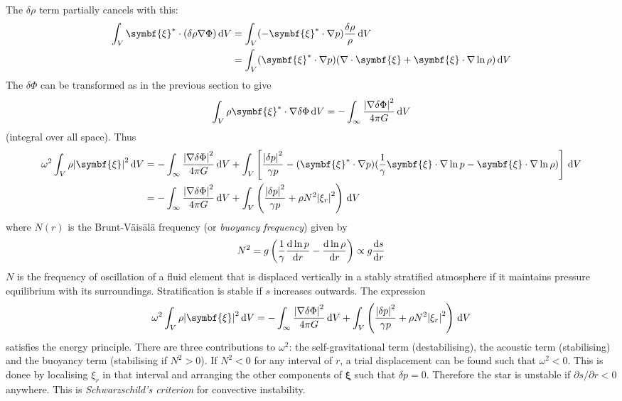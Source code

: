 \documentclass{jknotes}
\newcommand{\disp}{\symbf{\xi}}
\begin{document}
The $\delta \rho$ term partially cancels with this:
\begin{align}
	\int_V \disp^* \cdot (\delta \rho \nabla \Phi) \, \diffd V 
	&= \int_V (-\disp^* \cdot \nabla p) \frac{\delta \rho}{\rho} \, \diffd V \\
	&= \int_V (\disp^* \cdot \nabla p)(\nabla \cdot \disp + \disp \cdot \nabla
	\ln \rho) \, \diffd V
\end{align}
The $\delta \Phi$ can be transformed as in the previous section to give
\begin{equation}
	\int_V \rho \disp^* \cdot \nabla \delta \Phi \, \diffd V = -\int_\infty
	\frac{\abs{\nabla \delta \Phi}^2}{4\pi G} \, \diffd V
\end{equation}
(integral over all space). Thus
\begin{align}
	\omega^2 \int_V \rho \abs{\disp}^2 \, \diffd V 
	&= -\int_\infty
	\frac{\abs{\nabla \delta \Phi}^2}{4\pi G} \, \diffd V + \int_V \left[ 
	\frac{\abs{\delta p}^2}{\gamma p} -	(\disp^* \cdot \nabla
	p)(\frac{1}{\gamma}\disp \cdot \nabla \ln p - \disp \cdot
	\nabla \ln \rho)\right] \, \diffd V \\
	&= -\int_\infty \frac{\abs{\nabla \delta \Phi}^2}{4\pi G} \, \diffd V +
	\int_V \left( \frac{\abs{\delta p}^2}{\gamma p} + \rho N^2
	\abs{\xi_r}^2\right) \, \diffd V
\end{align}
where $N(r)$ is the Brunt-V\"{a}is\"{a}l\"{a} frequency (or \emph{buoyancy
frequency}) given by
\begin{equation}
	N^2 = g \left( \frac{1}{\gamma} \frac{\diffd \ln p}{\diffd r} -
	\frac{\diffd \ln \rho}{\diffd r} \right) \propto g \frac{\diffd s}{\diffd
	r}
\end{equation}
$N$ is the frequency of oscillation of a fluid element that is displaced
vertically in a stably stratified atmosphere if it maintains pressure
equilibrium with its surroundings. Stratification is stable if $s$ increases
outwards. The expression
\begin{equation}
	\omega^2 \int_V \rho \abs{\disp}^2 \, \diffd V 
	= -\int_\infty \frac{\abs{\nabla \delta \Phi}^2}{4\pi G} \, \diffd V +
	\int_V \left( \frac{\abs{\delta p}^2}{\gamma p} + \rho N^2
	\abs{\xi_r}^2\right) \, \diffd V
\end{equation}
satisfies the energy principle. There are three contributions to $\omega^2$:
the self-gravitational term (destabilising), the acoustic term (stabilising)
and the buoyancy term (stabilising if $N^2 > 0$). If $N^2 < 0$ for any
interval of $r$, a trial displacement can be found such that $\omega^2 < 0$.
This is donee by localising $\xi_r$ in that interval and arranging the other
components of $\disp$ such that $\delta p = 0$. Therefore the star is unstable
if $\partial s/\partial r < 0$ anywhere. This is \emph{Schwarzschild's
criterion} for convective instability.
\end{document}
